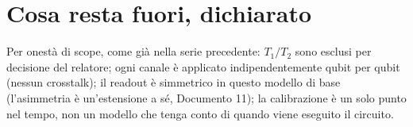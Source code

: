 \documentclass[11pt,a4paper]{article}
\begin{document}
\section{Cosa resta fuori, dichiarato}

Per onestà di scope, come già nella serie precedente: $T_1/T_2$ sono esclusi
per decisione del relatore; ogni canale è applicato indipendentemente qubit
per qubit (nessun crosstalk); il readout è simmetrico in questo modello di
base (l'asimmetria è un'estensione a sé, Documento 11); la calibrazione è un
solo punto nel tempo, non un modello che tenga conto di quando viene eseguito
il circuito.

\end{document}
